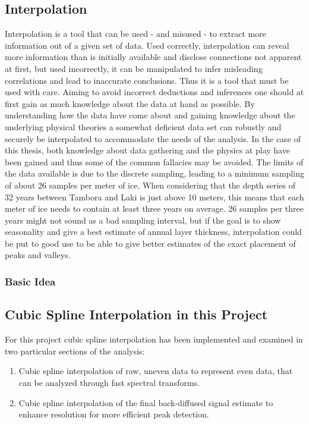 \documentclass[../../CompleteThesis2/Complete_2ndDraft]{subfiles}
\begin{document}
\subsection[Interpolation][Interpolation]{Interpolation}
\label{Subsec:CompMeths_SplinesAndInterpolation_Interpolation}
Interpolation is a tool that can be used - and misused - to extract more information out of a given set of data. Used correctly, interpolation can reveal more information than is initially available and disclose connections not apparent at first, but used incorrectly, it can be manipulated to infer misleading correlations and lead to inaccurate conclusions. Thus it is a tool that must be used with care. Aiming to avoid incorrect deductions and inferences one should at first gain as much knowledge about the data at hand as possible. By understanding how the data have come about and gaining knowledge about the underlying physical theories a somewhat deficient data set can robustly and securely be interpolated to accommodate the needs of the analysis. In the case of this thesis, both knowledge about data gathering and the physics at play have been gained and thus some of the common fallacies may be avoided. The limits of the data available is due to the discrete sampling, leading to a minimum sampling of about 26 samples per meter of ice.
When considering that the depth series of 32 years between Tambora and Laki is just above 10 meters, this means that each meter of ice needs to contain at least three years on average. 26 samples per three years might not sound as a bad sampling interval, but if the goal is to show seasonality and give a best estimate of annual layer thickness, interpolation could be put to good use to be able to give better estimates of the exact placement of peaks and valleys.\\	


\subsubsection[Basic Idea][Basic Idea]{Basic Idea}
\label{Subsubsec:CompMeths_SplinesAndInterpolation_Interpolation_BasicIdea}

\subsection[Interpolation in this Project][Interpolation in this Project]{Cubic Spline Interpolation in this Project}
\label{Subsec:CompMeths_SplinesAndInterpolation_InterpolationInThisProj}
For this project cubic spline interpolation has been implemented and examined in two particular sections of the analysis: 
\begin{enumerate}
	\item Cubic spline interpolation of raw, uneven data to represent even data, that can be analyzed through fast spectral transforms.
	\item Cubic spline interpolation of the final back-diffused signal estimate to enhance resolution for more efficient peak detection.
\end{enumerate}
\end{document}
